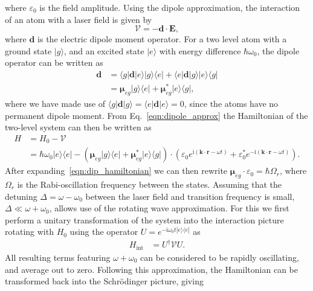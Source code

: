 where $\varepsilon_0$ is the field amplitude. Using the dipole approximation, the interaction of an atom with a laser field is given by~\cite{BK:Foot_2005}
\begin{equation}
\mathcal{V} = -{\mathbf{d}}\cdot {\mathbf{E}},
\end{equation}
where ${\mathbf{d}}$ is the electric dipole moment operator. For a two level atom with a ground state $| g \rangle$, and an excited state $| e \rangle$ with energy difference $\hbar \omega_0$, the dipole operator can be written as
\begin{align}\label{eqn:dipole_approx}
\mathbf{d} &= \langle g|\mathbf{d}|e \rangle | g \rangle \langle e | + \langle e|\mathbf{d}|g \rangle | e \rangle \langle g | \nonumber \\
&= \boldsymbol{\mu}_{eg} | g \rangle \langle e | + \boldsymbol{\mu}_{eg}^{*} | e \rangle \langle g |,
\end{align}
where we have made use of $\langle g|\mathbf{d}|g \rangle = \langle e|\mathbf{d}|e \rangle  = 0$, since the atoms have no permanent dipole moment. From Eq.~\eqref{eqn:dipole_approx} the Hamiltonian of the two-level system can then be written as
\begin{align}\label{eqn:dip_hamiltonian}
    H &= H_0  - \mathcal{V} \nonumber \\
      &=  \hbar\omega_0 |e\rangle\langle e | - (\boldsymbol{\mu}_{eg} | g \rangle \langle e | + \boldsymbol{\mu}_{eg}^{*} | e \rangle \langle g |)\cdot ( \varepsilon_0 e^{\textrm{i}\left(\mathbf{k}\cdot\mathbf{r} - \omega t\right)} +  \varepsilon_0^{*} e^{-\textrm{i}\left(\mathbf{k}\cdot\mathbf{r} - \omega t\right)}).
\end{align}
After expanding~\eqref{eqn:dip_hamiltonian} we can then rewrite $\boldsymbol{\mu}_{eg}\cdot \varepsilon_0 = \hbar\Omega_r$, where $\Omega_r$ is the Rabi-oscillation frequency between the states. Assuming that the detuning $\Delta = \omega - \omega_0$ between the laser field and transition frequency is small, $\Delta \ll \omega + \omega_0$, allows use of the rotating wave approximation. For this we first perform a unitary transformation of the system into the interaction picture rotating with $H_0$ using the operator $U = e^{-\textrm{i}\omega_0 t|e\rangle\langle e|}$ as
\begin{align}
    H_{\textrm{int}} & = U^{\dagger} \mathcal{V} U.
\end{align}
All resulting terms featuring $\omega + \omega_0$ can be considered to be rapidly oscillating, and average out to zero. Following this approximation, the Hamiltonian can be transformed back into the Schr\"odinger picture, giving
